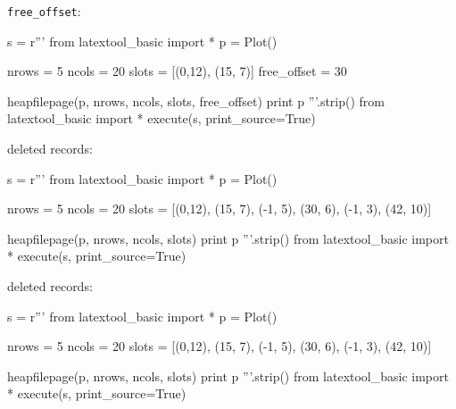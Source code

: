\newpage
\verb!free_offset!:
\begin{python}
s = r'''
from latextool_basic import *
p = Plot()

nrows = 5
ncols = 20
slots = [(0,12), (15, 7)]
free_offset = 30

heapfilepage(p, nrows, ncols, slots, free_offset)
print p
'''.strip()
from latextool_basic import *
execute(s, print_source=True)
\end{python}


\newpage
deleted records:
\begin{python}
s = r'''
from latextool_basic import *
p = Plot()

nrows = 5
ncols = 20
slots = [(0,12), (15, 7), (-1, 5), (30, 6), (-1, 3), (42, 10)]

heapfilepage(p, nrows, ncols, slots)
print p
'''.strip()
from latextool_basic import *
execute(s, print_source=True)
\end{python}



\newpage
deleted records:
\begin{python}
s = r'''
from latextool_basic import *
p = Plot()

nrows = 5
ncols = 20
slots = [(0,12), (15, 7), (-1, 5), (30, 6), (-1, 3), (42, 10)]

heapfilepage(p, nrows, ncols, slots)
print p
'''.strip()
from latextool_basic import *
execute(s, print_source=True)
\end{python}
